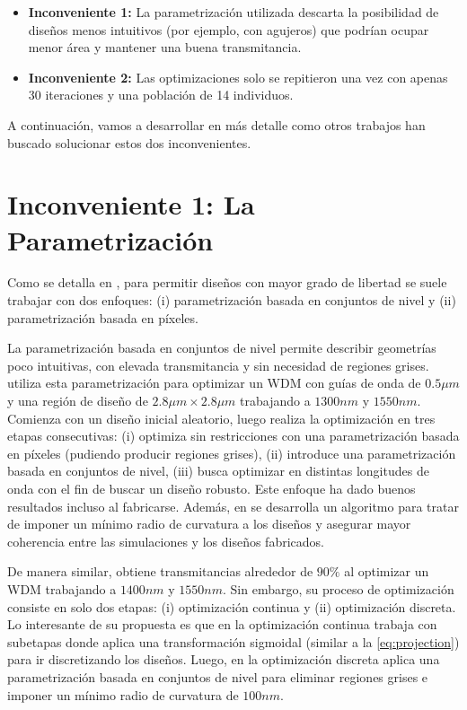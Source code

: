 \begin{itemize}
  \item \textbf{Inconveniente 1:} 
  La parametrización utilizada descarta la posibilidad de diseños menos 
  intuitivos (por ejemplo, con agujeros) que podrían ocupar menor área y mantener una buena transmitancia.
  
  \item \textbf{Inconveniente 2:}
  Las optimizaciones solo se repitieron una vez con apenas 30 iteraciones y una población de 14 individuos.

\end{itemize}


A continuación, vamos a desarrollar en más detalle como otros trabajos han buscado solucionar estos dos inconvenientes.

\section{Inconveniente 1: La Parametrización}

Como se detalla en \cite{Molesky2018}, para permitir diseños con mayor grado de libertad se suele 
trabajar con dos enfoques:
(i) parametrización basada en conjuntos de nivel y
(ii) parametrización basada en píxeles.


La parametrización basada en conjuntos de nivel permite describir geometrías poco intuitivas,
con elevada transmitancia y sin necesidad de regiones grises.
\cite{Piggott2015} utiliza esta parametrización para optimizar un WDM con guías de onda de $0.5 \mu m$
y una región de diseño de $2.8 \mu m \times 2.8 \mu m$ trabajando a $1300 nm$ y $1550 nm$.
Comienza con un diseño inicial aleatorio, luego realiza la optimización en tres etapas consecutivas:
(i) optimiza sin restricciones con una parametrización basada en píxeles (pudiendo producir regiones grises),
(ii) introduce una parametrización basada en conjuntos de nivel,
(iii) busca optimizar en distintas longitudes de onda con el fin de buscar un diseño robusto.
Este enfoque ha dado buenos resultados incluso al fabricarse. 
Además, en \cite{Piggott2017} se desarrolla
un algoritmo para tratar de imponer un mínimo radio de curvatura a los diseños y asegurar 
mayor coherencia entre las simulaciones y los diseños fabricados.

De manera similar, \cite{Su2020} obtiene transmitancias alrededor de $90\%$ al
optimizar un WDM trabajando a $1400nm$ y $1550 nm$.
Sin embargo, su proceso de optimización consiste en solo dos etapas:
(i) optimización continua y
(ii) optimización discreta.
Lo interesante de su propuesta es que en la optimización continua trabaja con subetapas donde aplica
una transformación sigmoidal (similar a la \autoref{eq:projection}) para ir discretizando los diseños.
Luego, en la optimización discreta aplica una parametrización basada en conjuntos de nivel para 
eliminar regiones grises e imponer un mínimo radio de curvatura de $100 nm$.


